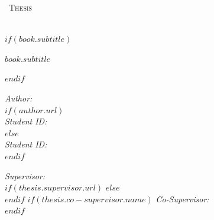 \frontmatter %

\pagestyle{plain} %


\begin{titlepage}
\begin{center}

\vspace*{.06\textheight}
{\scshape\LARGE \univname\par}\vspace{1.5cm} %
\textsc{\Large \degreename\ Thesis}\\[0.5cm] %

\HRule \\[0.4cm] %
{\LARGE \bfseries \ttitle\par}\vspace{0.2cm} %
$if(book.subtitle)$
{\normalsize\bfseries $book.subtitle$\par}\vspace{0.2cm} %
$endif$
\HRule \\[1.5cm] %
 
\begin{minipage}[t]{0.4\textwidth}
\begin{flushleft} \normalsize
\emph{Author:}\\
$if(author.url)$
\href{$author.url$}{\authorname}\\[0.3cm] %
\emph{Student ID:}\\
\thesistudentid
$else$
\authorname\\[0.3cm]
\emph{Student ID:}\\
\thesistudentid
$endif$
\end{flushleft}
\end{minipage}
\begin{minipage}[t]{0.4\textwidth}
\begin{flushright} \normalsize
\emph{Supervisor:} \\
$if(thesis.supervisor.url)$%
\href{$thesis.supervisor.url$}{\supname} %
$else$%
\supname\\[0.3cm]
$endif$
$if(thesis.co-supervisor.name)$
\emph{Co-Supervisor:}\\
\cosupname
$endif$
\end{flushright}
\end{minipage}\\[3cm]
 

\end{center}
\end{titlepage}
